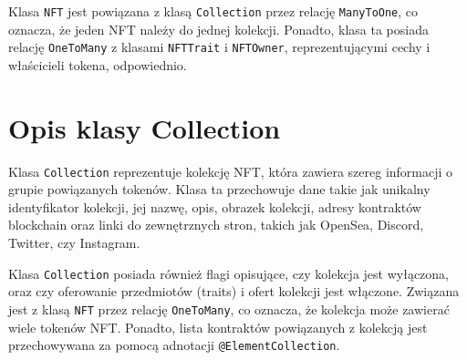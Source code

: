 Klasa \texttt{NFT} jest powiązana z klasą \texttt{Collection} przez relację \texttt{ManyToOne}, co oznacza, że jeden NFT należy do jednej kolekcji. Ponadto, klasa ta posiada relację \texttt{OneToMany} z klasami \texttt{NFTTrait} i \texttt{NFTOwner}, reprezentującymi cechy i właścicieli tokena, odpowiednio. 
\section{Opis klasy Collection}

Klasa \texttt{Collection} reprezentuje kolekcję NFT, która zawiera szereg informacji o grupie powiązanych tokenów. Klasa ta przechowuje dane takie jak unikalny identyfikator kolekcji, jej nazwę, opis, obrazek kolekcji, adresy kontraktów blockchain oraz linki do zewnętrznych stron, takich jak OpenSea, Discord, Twitter, czy Instagram.

Klasa \texttt{Collection} posiada również flagi opisujące, czy kolekcja jest wyłączona, oraz czy oferowanie przedmiotów (traits) i ofert kolekcji jest włączone. Związana jest z klasą \texttt{NFT} przez relację \texttt{OneToMany}, co oznacza, że kolekcja może zawierać wiele tokenów NFT. Ponadto, lista kontraktów powiązanych z kolekcją jest przechowywana za pomocą adnotacji \texttt{@ElementCollection}.